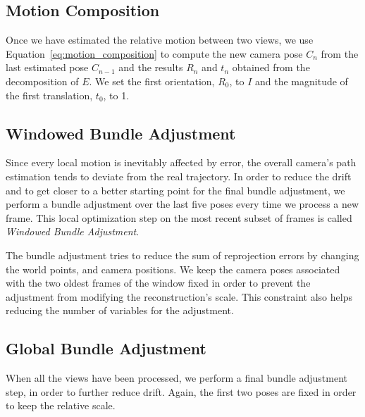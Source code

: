 \subsection{Motion Composition}
Once we have estimated the relative motion between two views, we use 
Equation~\ref{eq:motion_composition} to compute the new camera pose $C_n$ from 
the last estimated pose $C_{n-1}$ and the results $R_{n}$ and $t_n$ obtained 
from the decomposition of $E$.
We set the first orientation, $R_0$, to $I$ and the magnitude of the first 
translation, $t_0$, to 1.

\subsection{Windowed Bundle Adjustment}
Since every local motion is inevitably affected by error, the overall 
camera's path estimation tends to deviate from the real trajectory.
In order to reduce the drift and to get closer to a better starting point 
for the final bundle adjustment, we perform a bundle adjustment over the last five poses
every time we process a new frame.
This local optimization step on the most recent subset of frames is called
\textit{Windowed Bundle Adjustment}.

The bundle adjustment tries to reduce the sum of reprojection errors by changing the
world points, and camera positions. 
We keep the camera poses associated with the two oldest frames of the window 
fixed in order to prevent the adjustment from modifying the reconstruction's 
scale. This constraint also helps reducing the number of variables for the 
adjustment.

\subsection{Global Bundle Adjustment}
When all the views have been processed, we perform a final bundle adjustment 
step, in order to further reduce drift. Again, the first two poses are fixed in 
order to keep the relative scale.

